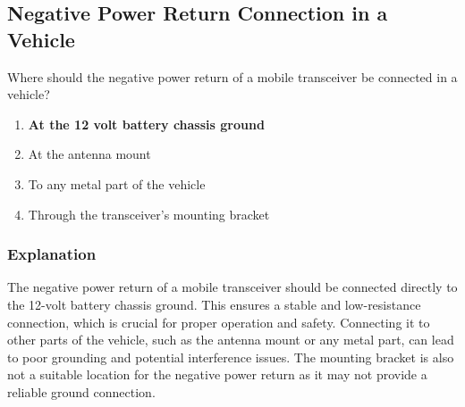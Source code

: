 \subsection{Negative Power Return Connection in a Vehicle}
\label{T4A11}

\begin{tcolorbox}[colback=gray!10!white,colframe=black!75!black,title=T4A11]
Where should the negative power return of a mobile transceiver be connected in a vehicle?
\begin{enumerate}[noitemsep]
    \item \textbf{At the 12 volt battery chassis ground}
    \item At the antenna mount
    \item To any metal part of the vehicle
    \item Through the transceiver’s mounting bracket
\end{enumerate}
\end{tcolorbox}

\subsubsection*{Explanation}
The negative power return of a mobile transceiver should be connected directly to the 12-volt battery chassis ground. This ensures a stable and low-resistance connection, which is crucial for proper operation and safety. Connecting it to other parts of the vehicle, such as the antenna mount or any metal part, can lead to poor grounding and potential interference issues. The mounting bracket is also not a suitable location for the negative power return as it may not provide a reliable ground connection.